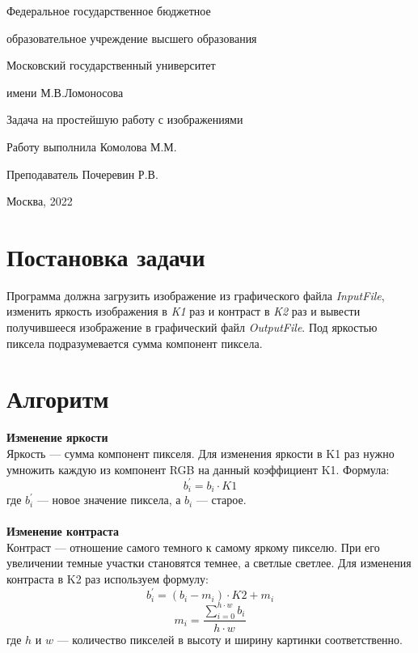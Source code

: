 \documentclass{article}
\begin{document}
\begin{titlepage}

\thispagestyle{empty}

\centerline{\Large{Федеральное государственное бюджетное}}
\centerline{\Large{образовательное учреждение высшего образования}}
\centerline{\Large{Московский государственный университет}}
\centerline{\Large{имени М.В.Ломоносова}}

\vfill

\centerline{\huge{Задача на простейшую работу с изображениями}}

\vfill
\vfill

Работу выполнила \hfill Комолова М.М.

Преподаватель \hfill Почеревин Р.В.

\vfill

\centerline{Москва, 2022}
\clearpage
\end{titlepage} 

\newpage
\section{Постановка задачи}
 
Программа должна загрузить изображение из графического файла
{\em InputFile\/}, изменить яркость изображения в {\em K1\/} раз и контраст в {\em K2\/} раз
и вывести получившееся изображение в графический файл {\em OutputFile\/}.
Под яркостью пиксела подразумевается сумма компонент пиксела.
\\
\section{Алгоритм}

{\bf Изменение яркости\/}
\\Яркость --- сумма компонент пикселя. Для изменения яркости в K1 раз нужно умножить каждую из компонент RGB на данный коэффициент K1. Формула:
$$b_{i}^{'} = b_{i}\cdot K1$$ где $b_{i}^{'}$ --- новое значение пиксела, а $b_{i}$ --- старое.
\\
\\
{\bf Изменение контраста\/}
\\Контраст --- отношение самого темного к самому яркому пикселю. При его увеличении темные участки становятся темнее, а светлые светлее. Для изменения контраста в K2 раз используем формулу:
$$b_{i}^{'} = (b_{i}-m_{i})\cdot K2+m_{i}$$ $$m_{i} = \frac {\sum\limits_{i = 0}^{h\cdot w}b_{i}}{h\cdot w}$$ где $h$ и $w$ --- количество пикселей в высоту и ширину картинки соответственно.
\end{document}
